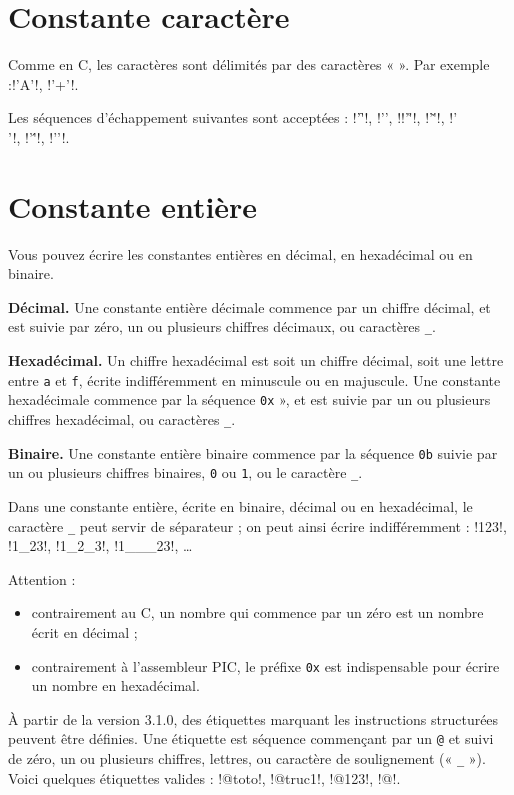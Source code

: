 \section{Constante caractère}

Comme en C, les caractères sont délimités par des caractères « \texttt{\textquotesingle} ». Par exemple :\pic!'A'!, \pic!'+'!.


Les séquences d’échappement suivantes sont acceptées : \pic!'\f'!, \pic!'\n', !\pic!'\r'!, \pic!'\v'!, \pic!'\\'!, \pic!'\''!, \pic!'\0'!.

\section{Constante entière}

Vous pouvez écrire les constantes entières en décimal, en hexadécimal ou en binaire. 

\textbf{Décimal.} Une constante entière décimale commence par un chiffre décimal, et est suivie par zéro, un ou plusieurs chiffres décimaux, ou caractères \texttt{\_}.

\textbf{Hexadécimal.} Un chiffre hexadécimal est soit un chiffre décimal, soit une lettre entre \texttt{a} et \texttt{f}, écrite indifféremment en minuscule ou en majuscule. Une constante hexadécimale commence par la séquence \texttt{0x} », et est suivie par un ou plusieurs chiffres hexadécimal, ou caractères \texttt{\_}.

\textbf{Binaire.} Une constante entière binaire commence par la séquence \texttt{0b} suivie par un ou plusieurs chiffres binaires, \texttt{0} ou \texttt{1}, ou le caractère \texttt{\_}.

Dans une constante entière, écrite en binaire, décimal ou en hexadécimal, le caractère \texttt{\_} peut servir de séparateur ; on peut ainsi écrire indifféremment : \pic!123!, \pic!1_23!, \pic!1_2_3!, \pic!1___23!, \dots

Attention :
\begin{itemize}
  \item contrairement au C, un nombre qui commence par un zéro est un nombre écrit en décimal ;
  \item contrairement à l’assembleur PIC, le préfixe \texttt{0x} est indispensable pour écrire un nombre en hexadécimal.
\end{itemize}



À partir de la version 3.1.0, des étiquettes marquant les instructions structurées peuvent être définies. Une étiquette est séquence commençant par un \texttt{@} et suivi de zéro, un ou plusieurs chiffres, lettres, ou caractère de soulignement (« \texttt{\_} »). Voici quelques étiquettes valides : \pic!@toto!, \pic!@truc1!, \pic!@123!, \pic!@!.

